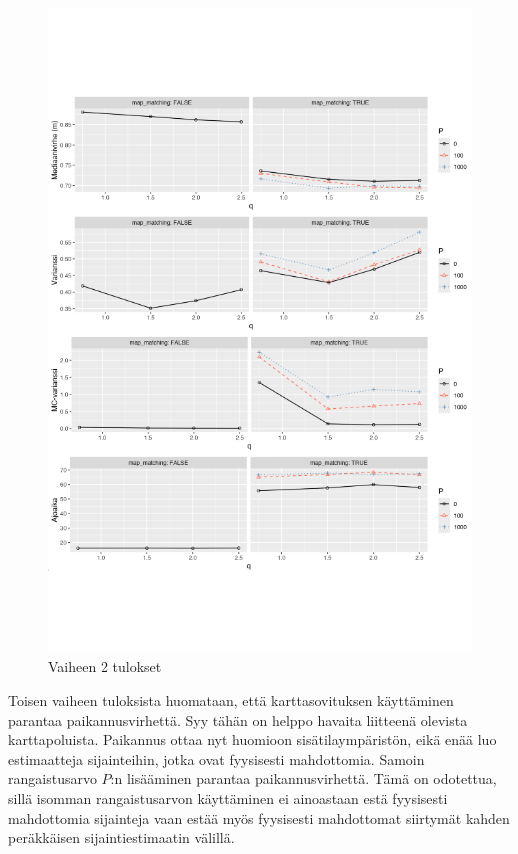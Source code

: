 \documentclass[
  12pt,
  a4paper, twoside]{book}
\begin{document}
\begin{figure}[H]
\centering
\includegraphics[width=15cm]{phase2_results_vertical_safe}
\caption{Vaiheen 2 tulokset}
\label{fig:phase2_results}
\end{figure}

Toisen vaiheen tuloksista huomataan, että karttasovituksen käyttäminen parantaa paikannusvirhettä. Syy tähän on helppo havaita liitteenä olevista karttapoluista. Paikannus ottaa nyt huomioon sisätilaympäristön, eikä enää luo estimaatteja sijainteihin, jotka ovat fyysisesti mahdottomia. Samoin rangaistusarvo \(P\):n lisääminen parantaa paikannusvirhettä. Tämä on odotettua, sillä isomman rangaistusarvon käyttäminen ei ainoastaan estä fyysisesti mahdottomia sijainteja vaan estää myös fyysisesti mahdottomat siirtymät kahden peräkkäisen sijaintiestimaatin välillä.
\end{document}
